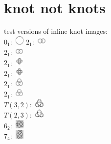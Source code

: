 \documentclass[12pt,aps,prd,onecolumn,nofootinbib,superscriptaddress]{revtex4-2}
\begin{document}
\section{knot not knots}
test versions of inline knot images:\\
 \( 0_1 \):~\includegraphics[height=1.2em]{images/0_1} \( 2_1 \):~\includegraphics[height=1.2em]{images/hopf}\\
 \( 2_1 \):~\includegraphics[height=1.2em]{images/ahopf}\\
 \( 2_1 \):~\includegraphics[height=1.2em]{images/solomon}\\
 \( 2_1 \):~\includegraphics[height=1.2em]{images/asolomon}\\
 \( 2_1 \):~\includegraphics[height=1.2em]{images/borromean}\\
 \( 2_1 \):~\includegraphics[height=1.2em]{images/aborromean}\\
 \( T(3,2) \):~\includegraphics[height=1.2em]{images/3_1}\\
 \( T(2,3) \):~\includegraphics[height=1.2em]{images/a3_1}\\
 \( 6_2 \):~\includegraphics[height=1.2em]{images/6_2}\\
 \( 7_4 \):~\includegraphics[height=1.2em]{images/7_4}\\
\end{document}
